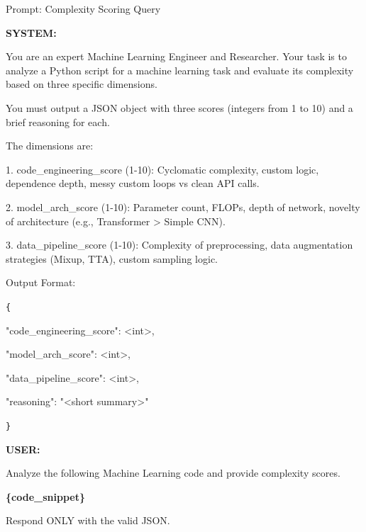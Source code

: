 \vspace{2em}


\begin{promptbox}{Prompt: Complexity Scoring Query}
    
\textbf{SYSTEM:}

You are an expert Machine Learning Engineer and Researcher.
Your task is to analyze a Python script for a machine learning task and evaluate its complexity based on three specific dimensions.

You must output a JSON object with three scores (integers from 1 to 10) and a brief reasoning for each.
\newline

The dimensions are:

1. code\_engineering\_score (1-10): Cyclomatic complexity, custom logic, dependence depth, messy custom loops vs clean API calls.

2. model\_arch\_score (1-10): Parameter count, FLOPs, depth of network, novelty of architecture (e.g., Transformer > Simple CNN).

3. data\_pipeline\_score (1-10): Complexity of preprocessing, data augmentation strategies (Mixup, TTA), custom sampling logic.
\newline

Output Format:

\texttt{\{}

\hspace{1em} "code\_engineering\_score": <int>,

\hspace{1em} "model\_arch\_score": <int>,

\hspace{1em} "data\_pipeline\_score": <int>,

\hspace{1em} "reasoning": "<short summary>"

\texttt{\}}
\newline

\textbf{USER:}

Analyze the following Machine Learning code and provide complexity scores.

\textbf{\{code\_snippet\}}

Respond ONLY with the valid JSON.

\end{promptbox}
\caption{Prompt used to instruct the auxiliary LLM for scoring the complexity of code solutions across three dimensions. This heuristic is used as a baseline to evaluate whether the World Model blindly favors complex code.}
\label{fig:appendix_complexity_prompt}
